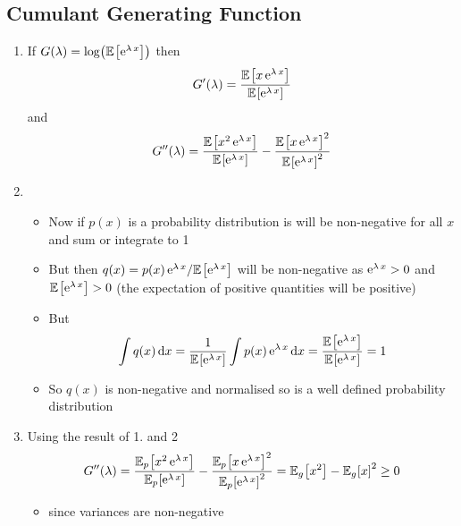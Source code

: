 \documentclass[11pt]{article}
\newcommand{\av}[2][]{\mathbb{E}_{#1\!}\left[ #2 \right]}
\newcommand{\logg}[1]{\log\!\left( #1 \right)}
\newcommand{\e}[1]{{\rm e}^{#1}}
\newcommand{\dd}{\mathrm{d}}
\begin{document}
\subsection{Cumulant Generating Function}
\label{sec:orga7b0d71}
\begin{enumerate}
\item If \(G(\lambda) = \logg{\av{\e{\lambda\,x}}}\) then
$$ G'(\lambda) = \frac{ \av{x\,\e{\lambda\,x}} }{
      \av{\e{\lambda\,x}} } $$
and
$$ G''(\lambda) = \frac{ \av{x^2\,\e{\lambda\,x}} }{
      \av{\e{\lambda\,x}} } - \frac{ \av{x\,\e{\lambda\,x}}^2 }{
      \av{\e{\lambda\,x}}^2 } $$
\item \begin{itemize}
\item Now if \(p(x)\) is a probability distribution is will be
non-negative for all \(x\) and sum or integrate to 1
\item But then \(q(x) = p(x)\,\e{\lambda\,x}/\av{\e{\lambda\,x}}\)
will be non-negative as \(\e{\lambda\,x}>0\) and
\(\av{\e{\lambda\,x}}>0\) (the expectation of positive
quantities will be positive)
\item But
$$ \int q(x) \, \dd x = \frac{1}{\av{\e{\lambda\,x}}} \int
        p(x)\, \e{\lambda\,x}\,\dd x=
        \frac{\av{\e{\lambda\,x}}}{\av{\e{\lambda\,x}}} = 1 $$
\item So \(q(x)\) is non-negative and normalised so is a well defined
probability distribution
\end{itemize}
\item Using the result of 1. and 2
$$ G''(\lambda) = \frac{ \av[p]{x^2\,\e{\lambda\,x}} }{
      \av[p]{\e{\lambda\,x}} } - \frac{ \av[p]{x\,\e{\lambda\,x}}^2 }{
      \av[p]{\e{\lambda\,x}}^2 } = \av[g]{x^2} - \av[g]{x}^2 \geq 0 $$
\begin{itemize}
\item since variances are non-negative
\end{itemize}
\end{enumerate}
\end{document}
